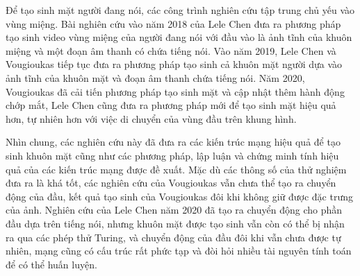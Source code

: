Để tạo sinh mặt người đang nói, các công trình nghiên cứu tập trung chủ yếu vào vùng miệng. Bài nghiên cứu vào năm 2018 của Lele Chen \cite{chen2018} đưa ra phương pháp tạo sinh video vùng miệng của người đang nói với đầu vào là ảnh tĩnh của khuôn miệng và một đoạn âm thanh có chứa tiếng nói. Vào năm 2019, Lele Chen \cite{chen2019} và Vougioukas \cite{vougioukas2019} tiếp tục đưa ra phương pháp tạo sinh cả khuôn mặt người dựa vào ảnh tĩnh của khuôn mặt và đoạn âm thanh chứa tiếng nói. Năm 2020, Vougioukas \cite{vougioukas2020} đã cải tiến phương pháp tạo sinh mặt và cập nhật thêm hành động chớp mắt, Lele Chen \cite{chen2020} cũng đưa ra phương pháp mới để tạo sinh mặt hiệu quả hơn, tự nhiên hơn với việc di chuyển của vùng đầu trên khung hình.

Nhìn chung, các nghiên cứu này đã đưa ra các kiến trúc mạng hiệu quả để tạo sinh khuôn mặt cũng như các phương pháp, lập luận và chứng minh tính hiệu quả của các kiến trúc mạng được đề xuất. Mặc dù các thông số của thử nghiệm đưa ra là khá tốt, các nghiên cứu của Vougioukas vẫn chưa thể tạo ra chuyển động của đầu, kết quả tạo sinh của Vougioukas đôi khi không giữ được đặc trưng của ảnh. Nghiên cứu của Lele Chen năm 2020 \cite{chen2020} đã tạo ra chuyển động cho phần đầu dựa trên tiếng nói, nhưng khuôn mặt được tạo sinh vẫn còn có thể bị nhận ra qua các phép thử Turing, và chuyển động của đầu đôi khi vẫn chưa được tự nhiên, mạng cũng có cấu trúc rất phức tạp và đòi hỏi nhiều tài nguyên tính toán để có thể huấn luyện.

